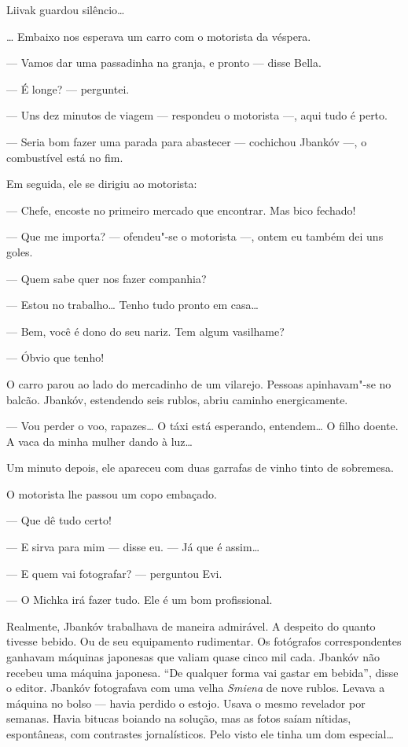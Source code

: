 Liivak guardou silêncio\ldots{}

\ldots{} Embaixo nos esperava um carro com o motorista da véspera.

--- Vamos dar uma passadinha na granja, e pronto --- disse
Bella.

--- É longe? --- perguntei.

--- Uns dez minutos de viagem --- respondeu o motorista
---, aqui tudo é perto.

--- Seria bom fazer uma parada para abastecer ---
cochichou Jbankóv ---, o combustível está no fim.

Em seguida, ele se dirigiu ao motorista:

--- Chefe, encoste no primeiro mercado que encontrar. Mas bico
fechado!

--- Que me importa? --- ofendeu"-se o motorista ---,
ontem eu também dei uns goles.

--- Quem sabe quer nos fazer companhia?

--- Estou no trabalho\ldots{} Tenho tudo pronto em casa\ldots{}

--- Bem, você é dono do seu nariz. Tem algum vasilhame?

--- Óbvio que tenho!

O carro parou ao lado do mercadinho de um vilarejo. Pessoas apinhavam"-se
no balcão. Jbankóv, estendendo seis rublos, abriu caminho energicamente.

--- Vou perder o voo, rapazes\ldots{} O táxi está esperando,
entendem\ldots{} O filho doente. A vaca da minha mulher dando à luz\ldots{}

Um minuto depois, ele apareceu com duas garrafas de vinho tinto de
sobremesa.

O motorista lhe passou um copo embaçado.

--- Que dê tudo certo!

--- E sirva para mim --- disse eu. --- Já que é
assim\ldots{}

--- E quem vai fotografar? --- perguntou Evi.

--- O Michka irá fazer
tudo. Ele é um bom profissional.

Realmente, Jbankóv trabalhava de maneira admirável. A despeito do quanto
tivesse bebido. Ou de seu equipamento rudimentar. Os fotógrafos
correspondentes ganhavam máquinas japonesas que valiam quase cinco mil
cada. Jbankóv não recebeu uma máquina japonesa. ``De qualquer forma vai
gastar em bebida'', disse o editor. Jbankóv fotografava com uma velha
\emph{Smiena} de nove rublos. Levava a máquina no bolso --- havia
perdido o estojo. Usava o mesmo revelador por semanas. Havia bitucas
boiando na solução, mas as fotos saíam nítidas, espontâneas, com
contrastes jornalísticos. Pelo visto ele tinha um dom especial\ldots{}

